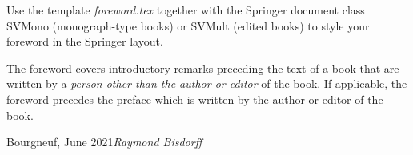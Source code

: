 %
%

\foreword

Use the template \textit{foreword.tex} together with the Springer document class SVMono (monograph-type books) or SVMult (edited books) to style your foreword in the Springer layout. 

The foreword covers introductory remarks preceding the text of a book that are written by a \textit{person other than the author or editor} of the book. If applicable, the foreword precedes the preface which is written by the author or editor of the book.


\vspace{\baselineskip}
\begin{flushright}\noindent
Bourgneuf, June 2021\hfill {\it Raymond Bisdorff}\\
\end{flushright}


